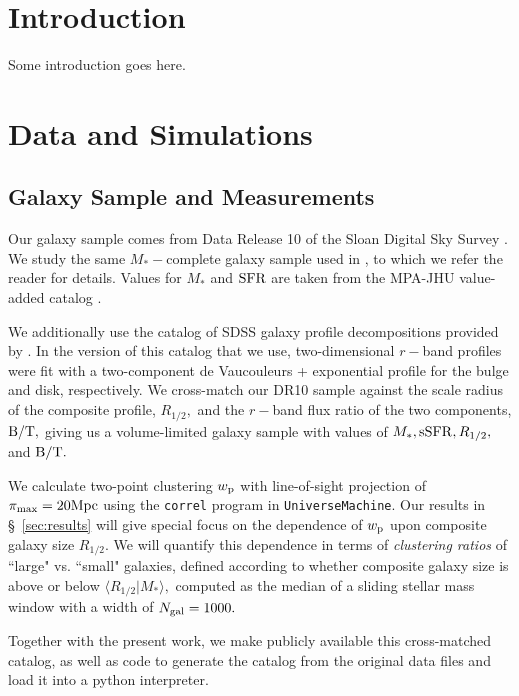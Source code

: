 \documentclass[usenatbib,usegraphicx,letterpaper]{mn2e}
\newcommand{\rhalf}{R_{1/2}}
\newcommand{\bt}{{\rm B/T}}
\newcommand{\mstar}{M_{\ast}}
\newcommand{\ssfr}{{\rm sSFR}}
\newcommand{\sfr}{{\rm SFR}}
\newcommand{\wproj}{w_{\rm p}}
\newcommand{\mpc}{{\rm Mpc}}
\begin{document}
\section{Introduction}
\label{sec:intro}
Some introduction goes here.

\section{Data and Simulations}
\label{sec:data}

\subsection{Galaxy Sample and Measurements}
\label{subsec:galaxydata}


Our galaxy sample comes from Data Release 10 of the Sloan Digital Sky Survey \citep[SDSS][]{ahn_etal14}. We study the same $\mstar-$complete galaxy sample used in \citet{behroozi_etal15}, to which we refer the reader for details. Values for $\mstar$ and $\sfr$ are taken from the MPA-JHU value-added catalog \citep{kauffmann_etal03,brinchmann_etal04}. 

We additionally use the catalog of SDSS galaxy profile decompositions provided by \citet{meert_etal15}. In the version of this catalog that we use, two-dimensional $r-$band profiles were fit with a two-component de Vaucouleurs + exponential profile for the bulge and disk, respectively. We cross-match our DR10 sample against the \citet{meert_etal15} scale radius of the composite profile, $\rhalf,$ and the $r-$band flux ratio of the two components, $\bt,$ giving us a volume-limited galaxy sample with values of $\mstar,\ssfr,\rhalf,$ and $\bt.$ 

We calculate two-point clustering $\wproj$ with line-of-sight projection of $\pi_{\rm max}=20\mpc$ using the {\tt correl} program in {\tt UniverseMachine}. Our results in \S~\ref{sec:results} will give special focus on the dependence of $\wproj$ upon composite galaxy size $\rhalf.$ We will quantify this dependence in terms of {\em clustering ratios} of ``large" vs. ``small" galaxies, defined according to whether composite galaxy size is above or below $\langle\rhalf\vert\mstar\rangle,$ computed as the median of a sliding stellar mass window with a width of $N_{\rm gal}=1000.$ 

Together with the present work, we make publicly available this cross-matched catalog, as well as code to generate the catalog from the original data files and load it into a python interpreter. 
\end{document}
